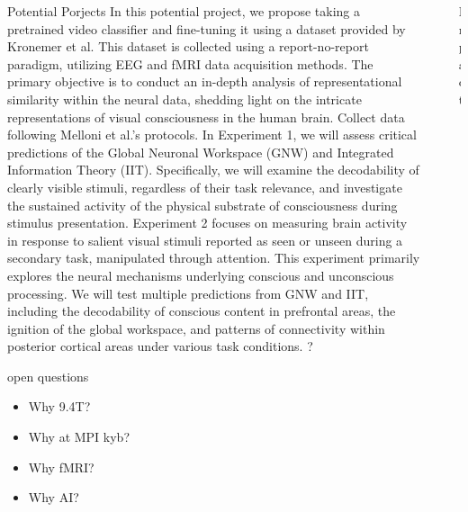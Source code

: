 \documentclass[final]{beamer}
\newlength{\sepwidth}
\newlength{\colwidth}
\newcommand{\separatorcolumn}{\begin{column}{\sepwidth}\end{column}}
\begin{document}
\begin{frame}[t]
\begin{columns}[t]
\begin{column}{\colwidth}
\begin{exampleblock}{Potential Porjects}
In this potential project, we propose taking a pretrained video classifier and fine-tuning it using a dataset provided by Kronemer et al. This dataset is collected using a report-no-report paradigm, utilizing EEG and fMRI data acquisition methods. The primary objective is to conduct an in-depth analysis of representational similarity within the neural data, shedding light on the intricate representations of visual consciousness in the human brain.
    Collect data following Melloni et al.'s protocols.
    In Experiment 1, we will assess critical predictions of the Global Neuronal Workspace (GNW) and Integrated Information Theory (IIT). Specifically, we will examine the decodability of clearly visible stimuli, regardless of their task relevance, and investigate the sustained activity of the physical substrate of consciousness during stimulus presentation.
    Experiment 2 focuses on measuring brain activity in response to salient visual stimuli reported as seen or unseen during a secondary task, manipulated through attention. This experiment primarily explores the neural mechanisms underlying conscious and unconscious processing. We will test multiple predictions from GNW and IIT, including the decodability of conscious content in prefrontal areas, the ignition of the global workspace, and patterns of connectivity within posterior cortical areas under various task conditions.
    ?

  \end{exampleblock}

\begin{block}{open questions}  
    \begin{itemize}
        \item Why 9.4T?
        \item Why at MPI kyb?
        \item Why fMRI?
        \item Why AI?
    \end{itemize}

\end{block}

\end{column}

\separatorcolumn

\begin{column}{\colwidth}

    \begin{block}{Impact}


\end{block}
\end{column}
\end{columns}
\end{frame}
\end{document}
